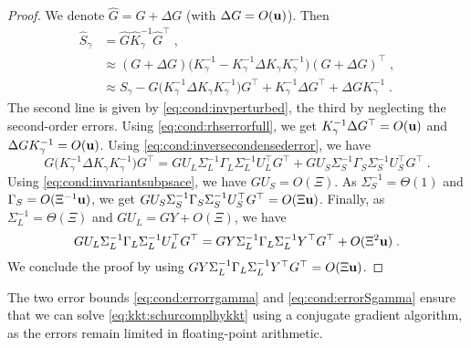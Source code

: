 \begin{proof}
  We denote $\widehat{G} = G + \Delta G$ (with $\Delta G = O(\mathbf{u})$). Then
  \begin{equation}
    \begin{aligned}
      \widehat{S}_\gamma &= \widehat{G} \widehat{K}_\gamma^{-1} \widehat{G}^\top \; , \\
                         &\approx (G + \Delta G)\big(K_\gamma^{-1} - K_\gamma^{-1}\Delta K_\gamma K_\gamma^{-1}\big)(G + \Delta G)^\top \;, \\
                    &\approx S_\gamma - G \big(K_\gamma^{-1}\Delta K_\gamma K_\gamma^{-1} \big)G^\top
                    + K_\gamma^{-1} \Delta G^\top + \Delta G K_\gamma^{-1} \; .
    \end{aligned}
  \end{equation}
  The second line is given by \eqref{eq:cond:invperturbed},
  the third by neglecting the second-order errors.
  Using \eqref{eq:cond:rhserrorfull}, we get $K_\gamma^{-1} \Delta G^\top = O(\mathbf{u})$
  and $\Delta G K_\gamma^{-1} = O(\mathbf{u})$.
  Using \eqref{eq:cond:inversecondensederror}, we have
  \begin{equation*}
    G \big(K_\gamma^{-1}\Delta K_\gamma K_\gamma^{-1} \big)G^\top =
G U_L \Sigma_L^{-1} \Gamma_L \Sigma_L^{-1}U_L^\top G^\top  +
G U_S \Sigma_S^{-1} \Gamma_S \Sigma_S^{-1}U_S^\top  G^\top \;.
  \end{equation*}
  Using \eqref{eq:cond:invariantsubpsace}, we have $G U_S = O(\Xi)$.
  As $\Sigma_S^{-1} = \Theta(1)$ and $\Gamma_S = O(\Xi^{-1} \mathbf{u})$, we
  get
  $G U_S \Sigma_S^{-1} \Gamma_S \Sigma_S^{-1}U_S^\top  G^\top = O(\Xi \mathbf{u})$.
  Finally, as $\Sigma_L^{-1} = \Theta(\Xi)$ and $G U_L = GY + O(\Xi)$,
  we have
  \begin{equation}
    G U_L \Sigma_L^{-1} \Gamma_L \Sigma_L^{-1}U_L^\top G^\top =
    G Y \Sigma_L^{-1} \Gamma_L \Sigma_L^{-1}Y^\top G^\top + O(\Xi^2 \mathbf{u}) \; .
  \end{equation}
  We conclude the proof by using
  $G Y \Sigma_L^{-1} \Gamma_L \Sigma_L^{-1}Y^\top G^\top = O(\Xi \mathbf{u})$.
\end{proof}
The two error bounds \eqref{eq:cond:errorrgamma} and
\eqref{eq:cond:errorSgamma} ensure that we can solve
\eqref{eq:kkt:schurcomplhykkt} using a conjugate gradient
algorithm, as the errors remain limited in floating-point
arithmetic.

